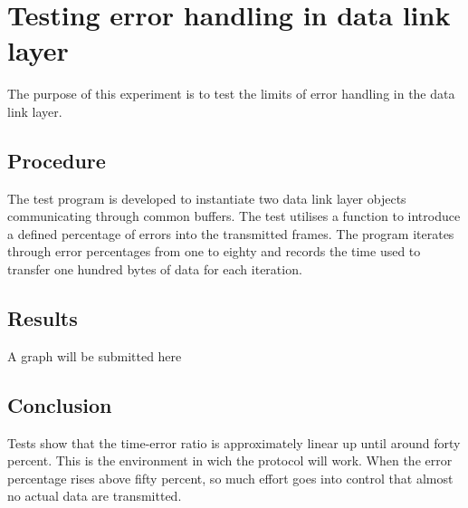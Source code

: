 \section{Testing error handling in data link layer}\label{app:exp:dll_result}
The purpose of this experiment is to test the limits of error handling in the
data link layer.

\subsection{Procedure}
The test program  is developed to instantiate two data
link layer objects communicating through common buffers. The test utilises a
function  to introduce a defined percentage of errors
into the transmitted frames. The program iterates through error percentages from
one to eighty and records the time used to transfer one hundred bytes of data
for each iteration.

\subsection{Results}
A graph will be submitted here

\subsection{Conclusion}
Tests show that the time-error ratio is approximately linear up until around
forty percent. This is the environment in wich the protocol will work. When the
error percentage rises above fifty percent, so much effort goes into control
that almost no actual data are transmitted.
